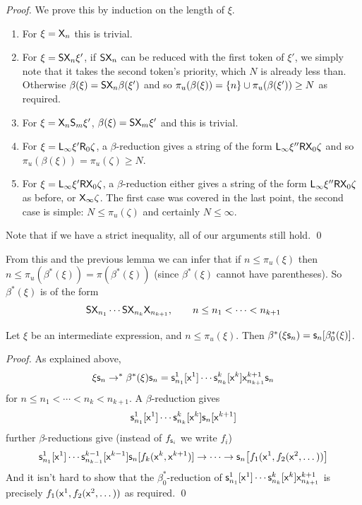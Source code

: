 \documentclass{llncs}
\begin{document}
\begin{proof}

    We prove this by induction on the length of $\xi$.
    \begin{enumerate}
        \item For $\xi=\mathsf{X}_n$ this is trivial.
        \item For $\xi=\mathsf{S}\mathsf{X}_n\xi'$, if $\mathsf{S}\mathsf{X}_n$ can be reduced with the first token of $\xi'$, we simply note that it takes the second token's priority, which $N$ is already less than.
        Otherwise $\beta(\xi)=\mathsf{S}\mathsf{X}_n\beta(\xi')$ and so $\pi_u(\beta(\xi))=\set n\cup\pi_u(\beta(\xi'))\geq N$ as required.
        \item For $\xi=\mathsf{X}_n\mathsf{S}_m\xi'$, $\beta(\xi)=\mathsf{S}\mathsf{X}_m\xi'$ and this is trivial.
        \item For $\xi=\mathsf{L}_\infty\xi'\mathsf{R}_0\zeta$, a $\beta$-reduction gives a string of the form $\mathsf{L}_\infty\xi''\mathsf{R}\mathsf{X}_0\zeta$ and so $\pi_u(\beta(\xi))=\pi_u(\zeta)\geq N$.
        \item For $\xi=\mathsf{L}_\infty\xi'\mathsf{R}\mathsf{X}_0\zeta$, a $\beta$-reduction either gives a string of the form $\mathsf{L}_\infty\xi''\mathsf{R}\mathsf{X}_0\zeta$ as before, or $\mathsf{X}_\infty\zeta$.
        The first case was covered in the last point, the second case is simple: $N\leq\pi_u(\zeta)$ and certainly $N\leq\infty$.
    \end{enumerate}
    Note that if we have a strict inequality, all of our arguments still hold.
    \qed

\end{proof}

From this and the previous lemma we can infer that if $n\leq\pi_u(\xi)$ then $n\leq\pi_u(\beta^*(\xi))=\pi(\beta^*(\xi))$ (since $\beta^*(\xi)$ cannot have parentheses).
So $\beta^*(\xi)$ is of the form
\[ \mathsf{S}\mathsf{X}_{n_1}\cdots\mathsf{S}\mathsf{X}_{n_k}\mathsf{X}_{n_{k+1}},\qquad n\leq n_1<\cdots<n_{k+1} \]

\begin{lemma}

    Let $\xi$ be an intermediate expression, and $n\leq\pi_u(\xi)$.
    Then $\beta^*(\xi\mathsf{s}_n)=\mathsf{s}_n[\beta^*_0(\xi)]$.

\end{lemma}

\begin{proof}

    As explained above,
    \[ \xi\mathsf{s}_n \to^* \beta^*(\xi)\mathsf{s}_n = \mathsf{s}^1_{n_1}[\mathsf{x}^1]\cdots\mathsf{s}^k_{n_k}[\mathsf{x}^k]\mathsf{x}^{k+1}_{n_{k+1}}\mathsf{s}_n \]
    for $n\leq n_1<\cdots<n_k<n_{k+1}$.
    A $\beta$-reduction gives
    \[ \mathsf{s}^1_{n_1}[\mathsf{x}^1]\cdots\mathsf{s}^k_{n_k}[\mathsf{x}^k]\mathsf{s}_n[\mathsf{x}^{k+1}] \]
    further $\beta$-reductions give (instead of $f_{\mathsf{s}_i}$ we write $f_i$)
    \[ \mathsf{s}^1_{n_1}[\mathsf{x}^1]\cdots\mathsf{s}^{k-1}_{n_{k-1}}[\mathsf{x}^{k-1}]\mathsf{s}_n[f_k(\mathsf{x}^k,\mathsf{x}^{k+1})] \to \cdots \to \mathsf{s}_n\bigl[f_1(\mathsf{x}^1,f_2(\mathsf{x}^2,\dots))\bigr] \]
    And it isn't hard to show that the $\beta^*_0$-reduction of $\mathsf{s}^1_{n_1}[\mathsf{x}^1]\cdots\mathsf{s}^k_{n_k}[\mathsf{x}^k]\mathsf{x}^{k+1}_{n_{k+1}}$ is precisely $f_1(\mathsf{x}^1,f_2(\mathsf{x}^2,\dots))$ as required.
    \qed

\end{proof}
\end{document}
